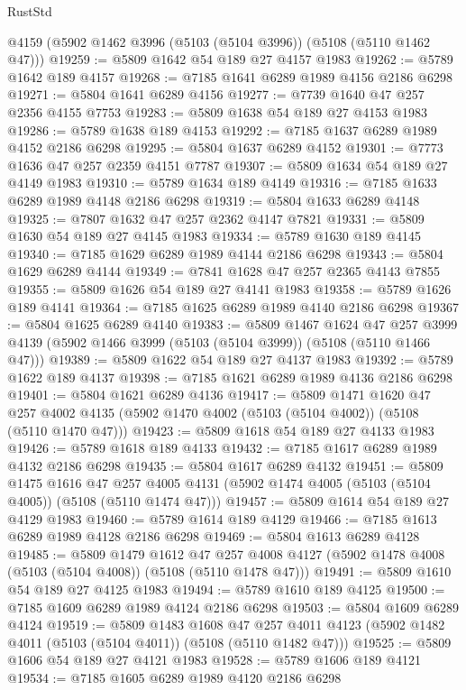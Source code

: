 \begin{lexlean}{RustStd}
\begin{coremodule}
    @4159
    (@5902 @1462 @3996 (@5103 (@5104 @3996)) (@5108 (@5110 @1462 @47)))
@19259 := @5809 @1642 @54 @189 @27 @4157 @1983
@19262 := @5789 @1642 @189 @4157
@19268 := @7185 @1641 @6289 @1989 @4156 @2186 @6298
@19271 := @5804 @1641 @6289 @4156
@19277 := @7739 @1640 @47 @257 @2356 @4155 @7753
@19283 := @5809 @1638 @54 @189 @27 @4153 @1983
@19286 := @5789 @1638 @189 @4153
@19292 := @7185 @1637 @6289 @1989 @4152 @2186 @6298
@19295 := @5804 @1637 @6289 @4152
@19301 := @7773 @1636 @47 @257 @2359 @4151 @7787
@19307 := @5809 @1634 @54 @189 @27 @4149 @1983
@19310 := @5789 @1634 @189 @4149
@19316 := @7185 @1633 @6289 @1989 @4148 @2186 @6298
@19319 := @5804 @1633 @6289 @4148
@19325 := @7807 @1632 @47 @257 @2362 @4147 @7821
@19331 := @5809 @1630 @54 @189 @27 @4145 @1983
@19334 := @5789 @1630 @189 @4145
@19340 := @7185 @1629 @6289 @1989 @4144 @2186 @6298
@19343 := @5804 @1629 @6289 @4144
@19349 := @7841 @1628 @47 @257 @2365 @4143 @7855
@19355 := @5809 @1626 @54 @189 @27 @4141 @1983
@19358 := @5789 @1626 @189 @4141
@19364 := @7185 @1625 @6289 @1989 @4140 @2186 @6298
@19367 := @5804 @1625 @6289 @4140
@19383 := @5809
    @1467
    @1624
    @47
    @257
    @3999
    @4139
    (@5902 @1466 @3999 (@5103 (@5104 @3999)) (@5108 (@5110 @1466 @47)))
@19389 := @5809 @1622 @54 @189 @27 @4137 @1983
@19392 := @5789 @1622 @189 @4137
@19398 := @7185 @1621 @6289 @1989 @4136 @2186 @6298
@19401 := @5804 @1621 @6289 @4136
@19417 := @5809
    @1471
    @1620
    @47
    @257
    @4002
    @4135
    (@5902 @1470 @4002 (@5103 (@5104 @4002)) (@5108 (@5110 @1470 @47)))
@19423 := @5809 @1618 @54 @189 @27 @4133 @1983
@19426 := @5789 @1618 @189 @4133
@19432 := @7185 @1617 @6289 @1989 @4132 @2186 @6298
@19435 := @5804 @1617 @6289 @4132
@19451 := @5809
    @1475
    @1616
    @47
    @257
    @4005
    @4131
    (@5902 @1474 @4005 (@5103 (@5104 @4005)) (@5108 (@5110 @1474 @47)))
@19457 := @5809 @1614 @54 @189 @27 @4129 @1983
@19460 := @5789 @1614 @189 @4129
@19466 := @7185 @1613 @6289 @1989 @4128 @2186 @6298
@19469 := @5804 @1613 @6289 @4128
@19485 := @5809
    @1479
    @1612
    @47
    @257
    @4008
    @4127
    (@5902 @1478 @4008 (@5103 (@5104 @4008)) (@5108 (@5110 @1478 @47)))
@19491 := @5809 @1610 @54 @189 @27 @4125 @1983
@19494 := @5789 @1610 @189 @4125
@19500 := @7185 @1609 @6289 @1989 @4124 @2186 @6298
@19503 := @5804 @1609 @6289 @4124
@19519 := @5809
    @1483
    @1608
    @47
    @257
    @4011
    @4123
    (@5902 @1482 @4011 (@5103 (@5104 @4011)) (@5108 (@5110 @1482 @47)))
@19525 := @5809 @1606 @54 @189 @27 @4121 @1983
@19528 := @5789 @1606 @189 @4121
@19534 := @7185 @1605 @6289 @1989 @4120 @2186 @6298

\end{coremodule}
\end{lexlean}
